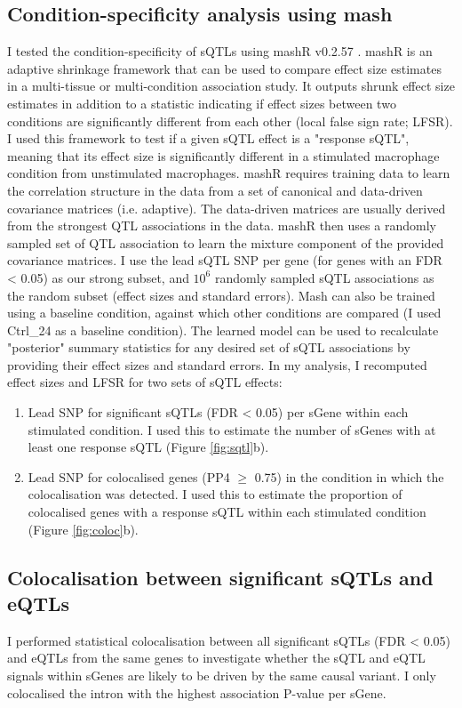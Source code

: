 \subsection{Condition-specificity analysis using mash}
I tested the condition-specificity of sQTLs using mashR v0.2.57 \cite{Urbut2019-gf}. mashR is an adaptive shrinkage framework that can be used to compare effect size estimates in a multi-tissue or multi-condition association study. It outputs shrunk effect size estimates in addition to a statistic indicating if effect sizes between two conditions are significantly different from each other (local false sign rate; LFSR). I used this framework to test if a given sQTL effect is a "response sQTL", meaning that its effect size is significantly different in a stimulated macrophage condition from unstimulated macrophages. mashR requires training data to learn the correlation structure in the data from a set of canonical and data-driven covariance matrices (i.e. adaptive). The data-driven matrices are usually derived from the strongest QTL associations in the data. mashR then uses a randomly sampled set of QTL association to learn the mixture component of the provided covariance matrices. I use the lead sQTL SNP per gene (for genes with an FDR < 0.05) as our strong subset, and $10^6$ randomly sampled sQTL associations as the random subset (effect sizes and standard errors). Mash can also be trained using a baseline condition, against which other conditions are compared (I used Ctrl\_24 as a baseline condition). The learned model can be used to recalculate "posterior" summary statistics for any desired set of sQTL associations by providing their effect sizes and standard errors. In my analysis, I recomputed effect sizes and LFSR for two sets of sQTL effects: 
\begin{enumerate}
\item Lead SNP for significant sQTLs (FDR < 0.05) per sGene within each stimulated condition. I used this to estimate the number of sGenes with at least one response sQTL (Figure \ref{fig:sqtl}b).
\item Lead SNP for colocalised genes (PP4 $\geq$ 0.75) in the condition in which the colocalisation was detected. I used this to estimate the proportion of colocalised genes with a response sQTL within each stimulated condition (Figure \ref{fig:coloc}b). 
\end{enumerate}
\subsection{Colocalisation between significant sQTLs and eQTLs}
I performed statistical colocalisation between all significant sQTLs (FDR < 0.05) and eQTLs from the same genes to investigate whether the sQTL and eQTL signals within sGenes are likely to be driven by the same causal variant. I only colocalised the intron with the highest association P-value per sGene.

